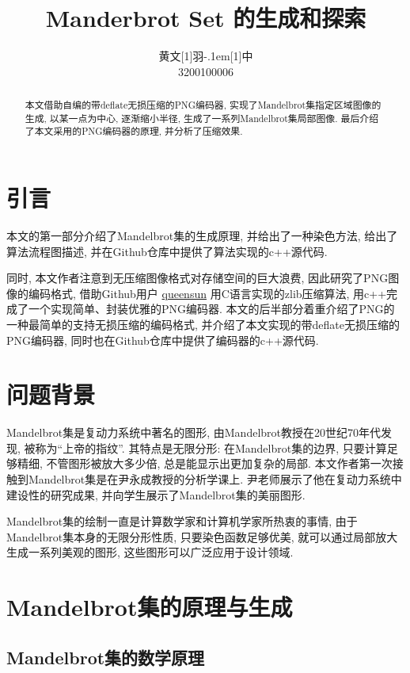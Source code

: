 \documentclass[UTF8]{ctexart}
\title{\textbf{Manderbrot Set 的生成和探索}}
\author{\CJKfamily{kai} 黄文\hbox{\scalebox{0.6}[1]{羽}\kern-.1em\scalebox{0.5}[1]{中}}\\3200100006}
\begin{document}
\maketitle

\begin{abstract}
     本文借助自编的带deflate无损压缩的PNG编码器, 实现了Mandelbrot集指定区域图像的生成, 以某一点为中心, 逐渐缩小半径, 生成了一系列Mandelbrot集局部图像. 最后介绍了本文采用的PNG编码器的原理, 并分析了压缩效果.
\end{abstract}

\section{引言}

本文的第一部分介绍了Mandelbrot集的生成原理, 并给出了一种染色方法, 给出了算法流程图描述, 并在Github仓库中提供了算法实现的c++源代码. 

同时, 本文作者注意到无压缩图像格式对存储空间的巨大浪费, 因此研究了PNG图像的编码格式, 借助Github用户 \href{https://Github.com/queensun}{queensun} 用C语言实现的zlib压缩算法, 用c++完成了一个实现简单、封装优雅的PNG编码器. 本文的后半部分着重介绍了PNG的一种最简单的支持无损压缩的编码格式, 并介绍了本文实现的带deflate无损压缩的PNG编码器, 同时也在Github仓库中提供了编码器的c++源代码. 

\section{问题背景}

Mandelbrot集是复动力系统中著名的图形, 由Mandelbrot教授在20世纪70年代发现, 被称为“上帝的指纹”. 其特点是无限分形: 在Mandelbrot集的边界, 只要计算足够精细, 不管图形被放大多少倍, 总是能显示出更加复杂的局部. 本文作者第一次接触到Mandelbrot集是在尹永成教授的分析学课上. 尹老师展示了他在复动力系统中建设性的研究成果, 并向学生展示了Mandelbrot集的美丽图形. 

Mandelbrot集的绘制一直是计算数学家和计算机学家所热衷的事情, 由于Mandelbrot集本身的无限分形性质, 只要染色函数足够优美, 就可以通过局部放大生成一系列美观的图形, 这些图形可以广泛应用于设计领域. 

\section{Mandelbrot集的原理与生成}

\subsection{Mandelbrot集的数学原理}
\end{document}
